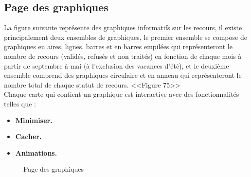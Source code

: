 \documentclass[12pt]{report}
\begin{document}
\newpage

\subsection{Page des graphiques}

La figure suivante représente des graphiques informatifs sur les recours, il existe principalement deux ensembles de graphiques, le premier ensemble se compose de graphiques en aires, lignes, barres et en barres empilées qui représenteront le nombre de recours (validés, refusés et non traités) en fonction de chaque mois à partir de septembre à mai (à l'exclusion des vacances d'été), et le deuxième ensemble comprend des graphiques circulaire et en anneau qui représenteront le nombre total de chaque statut de recours. <<Figure 75>>
\\
Chaque carte qui contient un graphique est interactive avec des fonctionnalités telles que :
\begin{itemize}
  \item \textbf{Minimiser.}
  \item \textbf{Cacher.}
  \item \textbf{Animations.}
\end{itemize}

\vspace{0.3in}

\begin{figure}[H]
\centering
\caption{Page des graphiques}
\end{figure}
\end{document}
